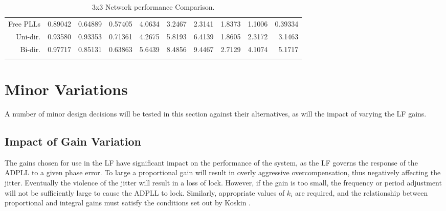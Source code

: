 \begin{table}[!ht]
\begin{center}
\begin{footnotesize}
\begin{tabular}{ll|r|r|r|r|r|r|r|r|r|}
                \multicolumn{2}{|r|}{Free PLLs} &0.89042 &0.64889 &0.57405    &4.0634 &3.2467 &2.3141    &1.8373&1.1006&0.39334 \T\\
                \multicolumn{2}{|r|}{Uni-dir.}  &0.93580 &0.93353 &0.71361    &4.2675 &5.8193 &6.4139    &1.8605&2.3172&3.1463  \T\\
                \multicolumn{2}{|r|}{Bi-dir.}   &0.97717 &0.85131 &0.63863    &5.6439 &8.4856 &9.4467    &2.7129&4.1074&5.1717  \T\\
                \hline
                \B                
            \end{tabular}
        \end{footnotesize}
        \caption{3x3 Network performance Comparison.}
        \label{table:3x3perf}
    \end{center}
    \vspace{-0.5cm}
\end{table}


\section{Minor Variations}\label{section:minor_variations}
A number of minor design decisions will be tested in this section against their alternatives, as will the impact of varying the \ac{LF} gains.

\subsection{Impact of Gain Variation}
The gains chosen for use in the \acl{LF} have significant impact on the performance of the system, as the \ac{LF} governs the response of the \ac{ADPLL} to a given phase error. To large a proportional gain will result in overly aggressive overcompensation, thus negatively affecting the jitter. Eventually the violence of the jitter will result in a loss of lock. However, if the gain is too small, the frequency or period adjustment will not be sufficiently large to cause the \ac{ADPLL} to lock. Similarly, appropriate values of $k_i$ are required, and the relationship between proportional and integral gains must satisfy the conditions set out by Koskin \cite{koskin2018generation}.

